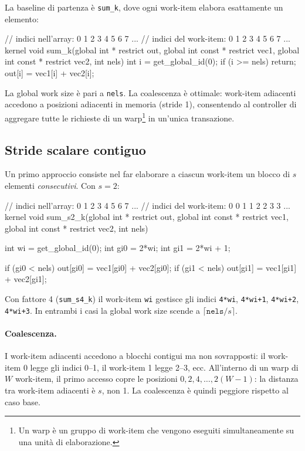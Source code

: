 La baseline di partenza è \texttt{sum\_k}, dove ogni work-item elabora esattamente un elemento:

\begin{code}[caption={Kernel di somma base: 1 work-item per elemento}, label={code:sum_k}]
// indici nell'array:    0 1 2 3 4 5 6 7 ...
// indici del work-item: 0 1 2 3 4 5 6 7 ...
kernel void sum_k(global int * restrict out,
    global int const * restrict vec1,
    global int const * restrict vec2,
    int nels)
{
    int i = get_global_id(0);
    if (i >= nels) return;
    out[i] = vec1[i] + vec2[i];
}
\end{code}

La global work size è pari a \texttt{nels}. La coalescenza è ottimale: work-item adiacenti accedono a posizioni adiacenti in memoria (stride 1), consentendo al controller di aggregare tutte le richieste di un warp\footnote{Un warp è un gruppo di work-item che vengono eseguiti simultaneamente su una unità di elaborazione.} in un'unica transazione.

\subsection{Stride scalare contiguo}

Un primo approccio consiste nel far elaborare a ciascun work-item un blocco di $s$ elementi \emph{consecutivi}. Con $s = 2$:

\begin{code}[caption={Stride scalare contiguo, fattore 2}, label={code:sum_s2_k}]
// indici nell'array:    0 1 2 3 4 5 6 7 ...
// indici del work-item: 0 0 1 1 2 2 3 3 ...
kernel void sum_s2_k(global int * restrict out,
    global int const * restrict vec1,
    global int const * restrict vec2,
    int nels)
{
    int wi = get_global_id(0);
    int gi0 = 2*wi;
    int gi1 = 2*wi + 1;

    if (gi0 < nels) out[gi0] = vec1[gi0] + vec2[gi0];
    if (gi1 < nels) out[gi1] = vec1[gi1] + vec2[gi1];
}
\end{code}

Con fattore 4 (\texttt{sum\_s4\_k}) il work-item \texttt{wi} gestisce gli indici \texttt{4*wi}, \texttt{4*wi+1}, \texttt{4*wi+2}, \texttt{4*wi+3}. In entrambi i casi la global work size scende a $\lceil\texttt{nels}/s\rceil$.

\paragraph{Coalescenza.}
I work-item adiacenti accedono a blocchi contigui ma non sovrapposti: il work-item 0 legge gli indici 0--1, il work-item 1 legge 2--3, ecc. All'interno di un warp di $W$ work-item, il primo accesso copre le posizioni $0, 2, 4, \ldots, 2(W{-}1)$: la distanza tra work-item adiacenti è $s$, non 1. La coalescenza è quindi peggiore rispetto al caso base.

